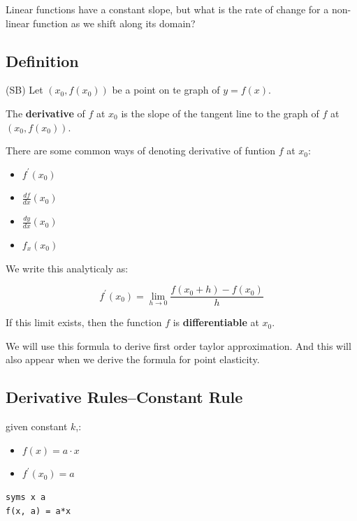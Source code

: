 \documentclass[
]{book}
\begin{document}
Linear functions have a constant slope, but what is the rate of change
for a non-linear function as we shift along its domain?

\hypertarget{definition}{%
\subsection{Definition}\label{definition}}

(SB) Let \((x_0 ,f(x_0 ))\) be a point on te graph of \(y=f(x)\).

The \textbf{derivative} of \(f\) at \(x_0\) is the slope of the tangent line to
the graph of \(f\) at \((x_0 ,f(x_0 ))\).

There are some common ways of denoting derivative of funtion \(f\) at
\(x_0\):

\begin{itemize}
\item
  \(\displaystyle f^{\prime } (x_0 )\)
\item
  \(\displaystyle \frac{df}{dx}(x_0 )\)
\item
  \(\displaystyle \frac{dy}{dx}(x_0 )\)
\item
  \(\displaystyle f_x (x_0 )\)
\end{itemize}

We write this analyticaly as:

\[f^{\prime } (x_0 )=\lim_{h\to 0} \frac{f(x_0 +h)-f(x_0 )}{h}\]

If this limit exists, then the function \(f\) is \textbf{differentiable} at
\(x_0\).

We will use this formula to derive first order taylor approximation. And
this will also appear when we derive the formula for point elasticity.

\hypertarget{derivative-rulesconstant-rule}{%
\subsection{Derivative Rules--Constant Rule}\label{derivative-rulesconstant-rule}}

given constant \(k\),:

\begin{itemize}
\item
  \(\displaystyle f(x)=a\cdot x\)
\item
  \(\displaystyle f^{\prime } (x_0 )=a\)
\end{itemize}

\begin{verbatim}
syms x a
f(x, a) = a*x
\end{verbatim}
\end{document}
